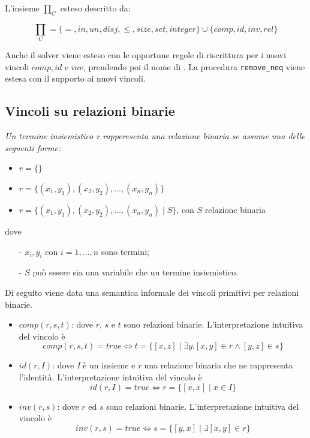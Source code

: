 \documentclass[12pt,a4paper,openright]{book} %
\begin{document}
L'insieme $\prod_C$ esteso descritto da:\\
\begin{center}
\begin{equation}
\prod_C = 
  \{  =, in, un, disj, \leq, size, set, integer  \}
    \cup
  \{  comp, id, inv, rel  \}
\end{equation}
\end{center}
Anche il solver \satset{} viene esteso con le opportune regole di riscrittura per i nuovi vincoli $comp, id$ e $inv$, prendendo poi il nome di \satbr{}. La procedura \texttt{remove\_neq} viene estesa con il supporto ai nuovi vincoli.

\subsection{Vincoli su relazioni binarie}
\label{sec:lang_lbr_binrel}

\textit{Un termine insiemistico r rapperesenta una relazione binaria se assume una delle seguenti forme:}

\begin{itemize}
\item $r = \{\}$

\item $r =
	\{
		( x_1, y_1 ), 
		( x_2, y_2 ),
		\ldots, 
		( x_n, y_n )
    \}$
    
\item $r =
	\{
		( x_1, y_1 ), 
		( x_2, y_2 ),
		\ldots, 
		( x_n, y_n )
		\mid
		S
    \}$, con $S$ relazione binaria
\end{itemize}
dove
\begin{itemize}
    \item[-] $x_i, y_i$ con $i = 1, \ldots, n$ sono termini;
    \item[-] $S$ può essere sia una variabile che un termine insiemistico.    
\end{itemize}

Di seguito viene data una semantica informale dei vincoli primitivi per relazioni binarie.

\begin{itemize}
\item $comp(r,s,t)$: dove $r$, $s$ e $t$ sono relazioni binarie. L’interpretazione intuitiva del vincolo è
\[
    comp(r, s, t) = true 
      \Longleftrightarrow 
    t = \{[x, z] \mid \exists y.[x, y] \in r \land [y, z] \in s\}
\]
    
\item $id(r,I)$: dove \textit{I} è un insieme e \textit{r} una relazione binaria che ne rappresenta l'identità. L’interpretazione intuitiva del vincolo è
\[
    id(r, I) = true 
      \Longleftrightarrow
    r = \{[x, x] \mid x \in I\}
\]

\item $inv(r,s)$: dove $r$ ed $s$ sono relazioni binarie. L’interpretazione intuitiva del vincolo è
\[
   inv(r, s) = true 
     \Longleftrightarrow 
   s = \{[y, x] \mid \exists [x, y] \in r\}
\]
\end{itemize}
\end{document}
